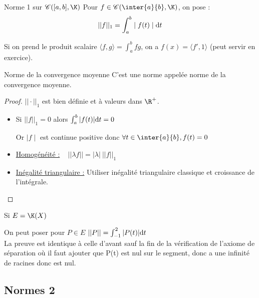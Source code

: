 \begin{definition}{Norme 1 sur $\mathscr C([a, b], \K)$}{}
    Pour $f \in \mathscr C(\inter{a}{b}, \K)$, on pose :
    $$||f||_1 = \int_{a }^{b } \mid f(t) \mid \text d t$$

\end{definition}

\begin{remarque}
    Si on prend le produit scalaire $\langle f, g \rangle = \int_{a}^{b} fg$, on a 
    $f(x) =  \langle f', 1 \rangle $ (peut servir en exercice). 
\end{remarque}

\begin{theoreme}{Norme de la convergence moyenne}{}
    C'est une norme appelée norme de la convergence moyenne. 
\end{theoreme}

\begin{proof}
    $||\cdot ||_1$ est bien définie et à valeurs dans $\R^+$.
    
    \begin{itemize}
        \item Si $||f||_1 = 0$ alors $\int_{a }^{b } |f(t)| \text d t = 0$

        Or $\mid f \mid $ est continue positive donc $\forall t \in \inter{a}{b}, f(t) = 0$

        \item \uline{Homogénéité :} ~ $|| \lambda f || = |\lambda| ~ ||f||_1$ 

        \item \uline{Inégalité triangulaire :} Utiliser inégalité triangulaire classique et croissance de l'intégrale.     
    \end{itemize}
\end{proof}

\begin{exemple}
    Si $E = \K(X)$
    
    On peut poser pour $P \in E$ $||P|| = \int_{-1}^{2} |P(t)| \text d t$ \\

    La preuve est identique à celle d'avant sauf la fin de la vérification de l'axiome de séparation 
    où il faut ajouter que P(t) est nul sur le segment, donc a une infinité de racines donc
    est nul. 
\end{exemple}

\subsection{Normes 2}

